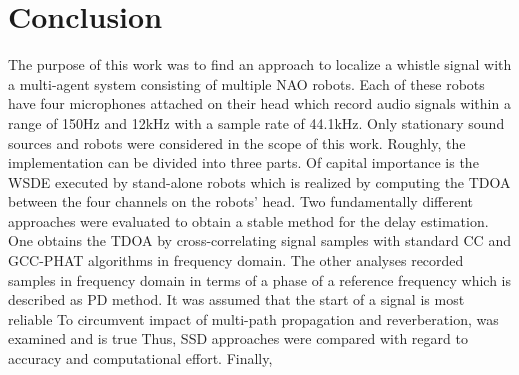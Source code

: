 \chapter{Conclusion}
\label{chap:05_conclusion}

\begin{comment}
    - Objective of this work:
        x a whistle-sound locator (in xy-plane) with multiple robots
        x stationary robots and sources
        x evaluated different tdoa methods
        - found a approach to detect direction of source on single robots
\end{comment}

The purpose of this work was to find an approach to localize a whistle
signal with a multi-agent system consisting of multiple NAO robots.
Each of these robots have four microphones attached on their head which
record audio signals within a range of 150\si{\hertz} and 12\si{\kilo\hertz}
with a sample rate of 44.1\si{\kilo\hertz}.
Only stationary sound sources and robots were considered in the scope of this
work.
Roughly, the implementation can be divided into three parts.
Of capital importance is the \acf{WSDE} executed by stand-alone robots which
is realized by computing the \ac{TDOA} between the four channels on the robots' head.
Two fundamentally different approaches were evaluated to obtain a stable method
for the delay estimation.
One obtains the \ac{TDOA} by cross-correlating signal samples with standard
\acf{CC} and \acf{GCC-PHAT} algorithms in frequency domain.
The other analyses recorded samples in frequency domain in terms of
a phase of a reference frequency which is described as \acf{PD} method.
It was assumed that the start of a signal is most reliable 
To circumvent impact of multi-path propagation and reverberation, 
was examined and is true
Thus, \acf{SSD} approaches were compared with regard to accuracy and computational effort.
Finally, 






